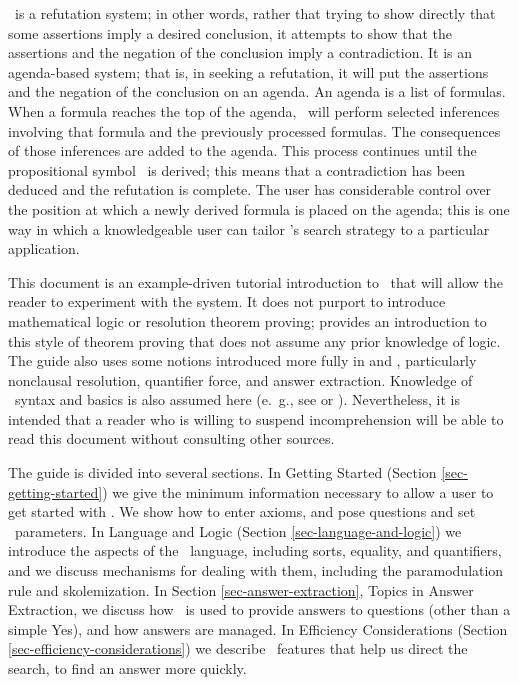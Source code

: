 \Snark\  is a refutation system; in other words, rather that trying to
show directly that some assertions imply a desired conclusion, it attempts to
show that the assertions and the negation of the conclusion imply a
contradiction.  It is an agenda-based system; that is, in seeking a
refutation, it will put the assertions and the negation of the conclusion on
an agenda. An agenda is a list of formulas.  When a formula reaches the top of
the agenda, \snark\  will perform selected inferences involving that formula
and the previously processed formulas.  The consequences of those inferences
are added to the agenda.  This process continues until the propositional
symbol
\false\  is derived; this means that a contradiction has been deduced
and the refutation is complete.  The user has considerable control
over the position at which a newly derived formula is placed on the
agenda; this is one way in which a knowledgeable user can tailor
\snark\/'s search strategy to a particular application.

 This document is an example-driven tutorial introduction to
\snark\  that will allow the reader to experiment with the system.
It does not purport to introduce mathematical logic or resolution theorem
proving; \cite{chang} provides an introduction to this style of theorem
proving that does not assume any prior knowledge of logic.  The guide also
uses some notions introduced more fully in \cite{manna} and
\cite{waldinger}, particularly nonclausal resolution, quantifier
force, and answer extraction.  Knowledge of \lisp\  syntax and basics
is also assumed here (e.\ g., see \cite{ansi-commonlisp} or
\cite{commonlisp-hyperspec}).  Nevertheless, it is intended that a
reader who is willing to suspend incomprehension will be able to
read this document without consulting other sources.


The guide is divided into several sections.  In Getting Started
(Section \ref{sec-getting-started}) we give the minimum information
necessary to allow a user to get started with \snark\/.  We show how
to enter axioms, and pose questions and set \snark\ parameters.  In
Language and Logic (Section \ref{sec-language-and-logic}) we introduce
the aspects of the \snark\  language, including sorts, equality, and
quantifiers, and we discuss mechanisms for dealing with them,
including the paramodulation rule and skolemization.  In Section
\ref{sec-answer-extraction}, Topics in Answer Extraction, we discuss
how \snark\  is used to provide answers to questions (other than a
simple Yes), and how answers are managed.  In Efficiency
Considerations (Section
\ref{sec-efficiency-considerations}) we describe \snark\  features that
help us direct the search, to find an answer more quickly.


